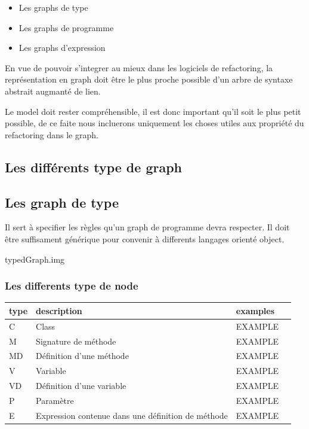 \documentclass[a4paper, 10pt]{article}
\begin{document}
\begin{itemize}
\item Les graphs de type
\item Les graphs de programme
\item Les graphs d'expression
\end{itemize}

En vue de pouvoir s'integrer au mieux dans les logiciels de refactoring, la représentation en graph doit être le plus proche possible d'un arbre de syntaxe abstrait augmanté de lien.

Le model doit rester compréhensible, il est donc important qu'il soit le plus petit possible, de ce faite nous incluerons uniquement les choses utiles aux propriété du refactoring dans le graph.

\subsection{Les différents type de graph}

\subsection{Les graph de type}

Il sert à specifier les règles qu'un graph de programme devra respecter. Il doit être suffisament générique pour convenir à differents langages orienté object.

typedGraph.img 

\subsubsection{Les differents type de node}


  \begin{tabular}{ | l | l | l | p{5cm} |}
    \hline
    type & description & examples \\ \hline
    C & Class & EXAMPLE   \\ \hline
    M & Signature de méthode & EXAMPLE   \\ \hline
    MD &  Définition d'une méthode & EXAMPLE   \\ \hline
    V &  Variable & EXAMPLE   \\ \hline
    VD &  Définition d'une variable  & EXAMPLE   \\ \hline
    P & Paramètre & EXAMPLE   \\ \hline
    E &  Expression contenue dans une définition de méthode & EXAMPLE   \\ \hline

    \end{tabular}
\end{document}
